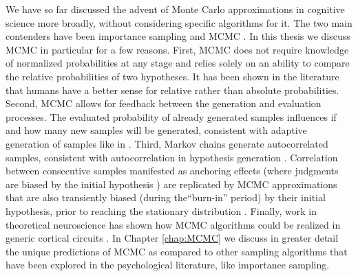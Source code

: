 We have so far discussed the advent of Monte Carlo approximations in cognitive science more broadly, without considering specific algorithms for it. The two main contenders have been importance sampling \cite{shi10} and MCMC \cite{Lieder2013}. In this thesis we discuss MCMC in particular for a few reasons. First, MCMC does not require knowledge of normalized probabilities at any stage and relies solely on an ability to compare the relative probabilities of two hypotheses. It has been shown in the literature \citep{stewart06} that humans have a better sense for relative rather than absolute probabilities. Second, MCMC allows for feedback between the generation and evaluation processes. The evaluated probability of already generated samples influences if and how many new samples will be generated, consistent with adaptive generation of samples like in \citet{hamrick2015think}. Third, Markov chains generate autocorrelated samples, consistent with autocorrelation in hypothesis generation \citep{multistability,vul08,Bonawitz2014}. Correlation between consecutive samples manifested as anchoring effects (where judgments are biased by the initial hypothesis \citep{tversky}) are replicated by MCMC approximations that are also transiently biased (during the``burn-in'' period) by their initial hypothesis, prior to reaching the stationary distribution \citep{Lieder2013}. Finally, work in theoretical neuroscience has shown how MCMC algorithms could be realized in generic cortical circuits \citep{buesing11,pecevski11,Moreno11}. In Chapter \ref{chap:MCMC} we discuss in greater detail the unique predictions of MCMC as compared to other sampling algorithms that have been explored in the psychological literature, like importance sampling.
%
%
